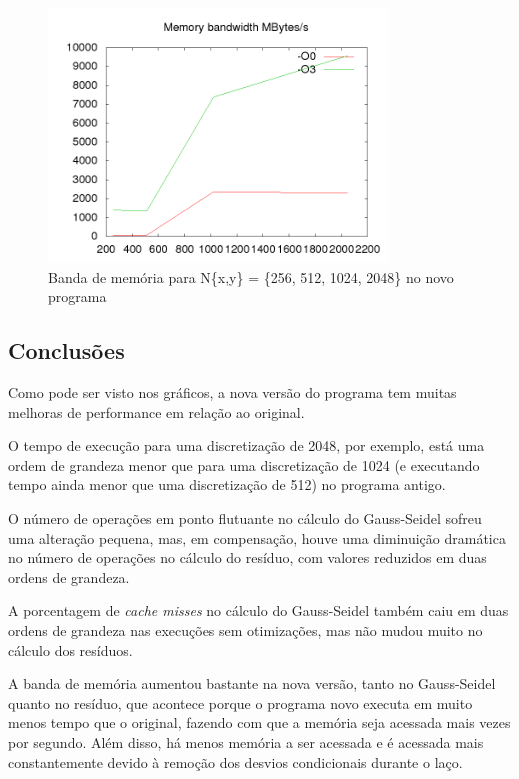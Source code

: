 \documentclass[12pt]{article}
\begin{document}
		\newpage
		\begin{figure}[ht!]
			\centering
			\includegraphics[width=90mm]{new_res_mem.png}
			\caption{Banda de memória para N\{x,y\} = \{256, 512, 1024, 2048\} no novo programa}
		\end{figure}
		\newpage
		
	\subsection{Conclusões}
	Como pode ser visto nos gráficos, a nova versão do programa tem muitas melhoras de performance em relação ao original.
	
	O tempo de execução para uma discretização de 2048, por exemplo, está uma ordem de grandeza menor que para uma discretização de 1024 (e executando tempo ainda menor que uma discretização de 512) no programa antigo.
	
	O número de operações em ponto flutuante no cálculo do Gauss-Seidel sofreu uma alteração pequena, mas, em compensação, houve uma diminuição dramática no número de operações no cálculo do resíduo, com valores reduzidos em duas ordens de grandeza.
	
	A porcentagem de \emph{cache misses} no cálculo do Gauss-Seidel também caiu em duas ordens de grandeza nas execuções sem otimizações, mas não mudou muito no cálculo dos resíduos.

	A banda de memória aumentou bastante na nova versão, tanto no Gauss-Seidel quanto no resíduo, que acontece porque o programa novo executa em muito menos tempo que o original, fazendo com que a memória seja acessada mais vezes por segundo. Além disso, há menos memória a ser acessada e é acessada mais constantemente devido à remoção dos desvios condicionais durante o laço.
	
\end{document}
